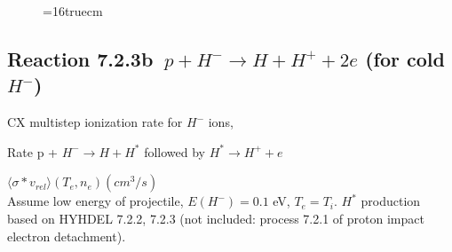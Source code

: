 \documentclass[12pt,dvips]{article}
\begin{document}
\begin{figure} \label{7.2.3a}
\epsfxsize=16truecm
\end{figure}
\newpage

\subsection{
Reaction 7.2.3b   $\  p + H^{-} \rightarrow  H + H^+ + 2e$ (for cold $H^-$)
}

  CX multistep ionization rate for $H^-$ ions,
 \cite{kn:Sawada}

  Rate p + $H^- \rightarrow H + H^*$ followed by $H^* \rightarrow H^+
+e$

$  \langle \sigma*v_{rel} \rangle(T_e,n_e) (cm^3/s)$ \\
Assume low energy of projectile, $E(H^-)=0.1$ eV, $T_e = T_i$.
$H^*$ production based on HYHDEL 7.2.2, 7.2.3 (not included: process 7.2.1 of proton impact electron detachment).
\end{document}
